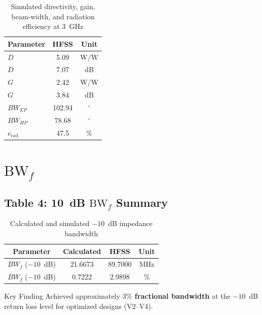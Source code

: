 \documentclass[compress,aspectratio=169,10pt]{beamer}
\begin{document}
\begin{frame}
    \begin{table}
        \centering
        \begin{tabular}{|l|c|c|}
            \hline
            \textbf{Parameter} & \textbf{HFSS} & \textbf{Unit} \\
            \hline
            $D$ & 5.09 & W/W \\
            \hline
            $D$ & 7.07 & dB \\
            \hline
            $G$ & 2.42 & W/W \\
            \hline
            $G$ & 3.84 & dB \\
            \hline
            $BW_{EP}$ & 102.94 & $^\circ$ \\
            \hline
            $BW_{HP}$ & 78.68 & $^\circ$ \\
            \hline
            $e_{\text{rad}}$ & 47.5 & \% \\
            \hline
        \end{tabular}
        \caption{Simulated directivity, gain, beam-width, and radiation efficiency at 3~GHz}
    \end{table}
\end{frame}

\section[Bandwidth]{\texorpdfstring{$\text{BW}_f$}{BW\_f}}

\subsection[Table 4]{Table 4: 10~dB $\text{BW}_f$ Summary}

\begin{frame}
    \begin{table}
        \centering
        \begin{tabular}{|c|c|c|c|}
            \hline
            \textbf{Parameter} & \textbf{Calculated} & \textbf{HFSS} & \textbf{Unit} \\
            \hline
            $BW_f$ ($-10$~dB) & 21.6673 & 89.7000 & MHz \\
            \hline
            $BW_f$ ($-10$~dB) & 0.7222 & 2.9898 & \% \\
            \hline
        \end{tabular}
        \caption{Calculated and simulated $-10$~dB impedance bandwidth}
        \label{tab:bandwidth-summary}
    \end{table}

    \vspace{1em}
    \begin{block}{Key Finding}
        Achieved approximately \textbf{$3\%$ fractional bandwidth} at the $-10$~dB return loss level for optimized designs (V2--V4).
    \end{block}
\end{frame}
\end{document}
